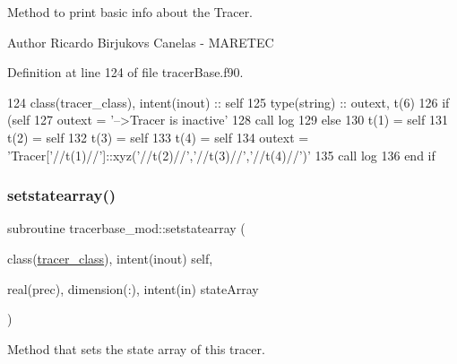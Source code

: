 Method to print basic info about the Tracer. 

\begin{DoxyAuthor}{Author}
Ricardo Birjukovs Canelas -\/ M\+A\+R\+E\+T\+EC 
\end{DoxyAuthor}


Definition at line 124 of file tracer\+Base.\+f90.


\begin{DoxyCode}
124     \textcolor{keywordtype}{class}(tracer\_class), \textcolor{keywordtype}{intent(inout)} :: self
125     \textcolor{keywordtype}{type}(string) :: outext, t(6)
126     \textcolor{keywordflow}{if} (self%
127         outext = \textcolor{stringliteral}{'-->Tracer is inactive'}
128         \textcolor{keyword}{call }log%
129     \textcolor{keywordflow}{else}
130         t(1) = self%
131         t(2) = self%
132         t(3) = self%
133         t(4) = self%
134         outext = \textcolor{stringliteral}{'Tracer['}//t(1)//\textcolor{stringliteral}{']::xyz('}//t(2)//\textcolor{stringliteral}{','}//t(3)//\textcolor{stringliteral}{','}//t(4)//\textcolor{stringliteral}{')'}
135         \textcolor{keyword}{call }log%
136 \textcolor{keywordflow}{    end if}
\end{DoxyCode}
\mbox{\label{namespacetracerbase__mod_af85802e927b07e777b94375550246c16}} 
\subsubsection{\texorpdfstring{setstatearray()}{setstatearray()}}
{\footnotesize\ttfamily subroutine tracerbase\+\_\+mod\+::setstatearray (\begin{DoxyParamCaption}\item[{class(\mbox{\hyperlink{structtracerbase__mod_1_1tracer__class}{tracer\+\_\+class}}), intent(inout)}]{self,  }\item[{real(prec), dimension(\+:), intent(in)}]{state\+Array }\end{DoxyParamCaption})\hspace{0.3cm}{\ttfamily [private]}}



Method that sets the state array of this tracer. 

